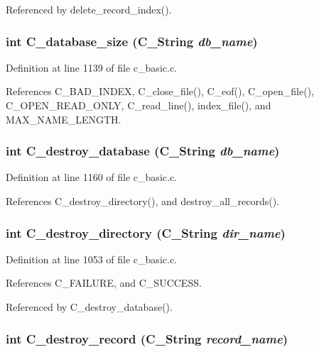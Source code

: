 Referenced by delete\_\-record\_\-index().
\subsubsection{\setlength{\rightskip}{0pt plus 5cm}int C\_\-database\_\-size (\bf{C\_\-String} {\em db\_\-name})}\label{c__basic_8c_9ec7a0a3eec5ac40c5425764bb2817b8}




Definition at line 1139 of file c\_\-basic.c.

References C\_\-BAD\_\-INDEX, C\_\-close\_\-file(), C\_\-eof(), C\_\-open\_\-file(), C\_\-OPEN\_\-READ\_\-ONLY, C\_\-read\_\-line(), index\_\-file(), and MAX\_\-NAME\_\-LENGTH.
\subsubsection{\setlength{\rightskip}{0pt plus 5cm}int C\_\-destroy\_\-database (\bf{C\_\-String} {\em db\_\-name})}\label{c__basic_8c_c1a15cb94cc3d2d9bb1f372033d37675}




Definition at line 1160 of file c\_\-basic.c.

References C\_\-destroy\_\-directory(), and destroy\_\-all\_\-records().
\subsubsection{\setlength{\rightskip}{0pt plus 5cm}int C\_\-destroy\_\-directory (\bf{C\_\-String} {\em dir\_\-name})}\label{c__basic_8c_cc30756158fa7aa162412cafbbec45c2}




Definition at line 1053 of file c\_\-basic.c.

References C\_\-FAILURE, and C\_\-SUCCESS.

Referenced by C\_\-destroy\_\-database().
\subsubsection{\setlength{\rightskip}{0pt plus 5cm}int C\_\-destroy\_\-record (\bf{C\_\-String} {\em record\_\-name})}\label{c__basic_8c_6ede0a4230cc5d957af94e50a40a80d0}




